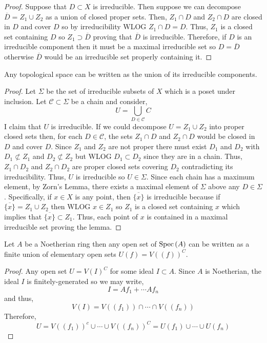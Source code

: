 \documentclass[12pt]{extarticle}
\begin{document}
\begin{proof}
Suppose that $D \subset X$ is irreducible. Then suppose we can decompose $\overline{D} = Z_1 \cup Z_2$ as a union of closed proper sets. Then, $Z_1 \cap D$ and $Z_2 \cap D$ are closed in $D$ and cover $D$ so by irreducibility WLOG $Z_1 \cap D = D$. Thus, $Z_1$ is a closed set containing $D$ so $Z_1 \supset \overline{D}$ proving that $\overline{D}$ is irreducible. Therefore, if $D$ is an irreducible component then it must be a maximal irreducible set so $D = \overline{D}$ otherwise $\overline{D}$ would be an irreducible set properly containing it. 
\end{proof}

\begin{lemma}
Any topological space can be written as the union of its irreducible components.
\end{lemma}

\begin{proof}
Let $\Sigma$ be the set of irreducible subsets of $X$ which is a poset under inclusion. Let $\mathcal{C} \subset \Sigma$ be a chain and consider,
\[ U = \bigcup_{D \in \mathcal{C}} C \]
I claim that $U$ is irreducible. If we could decompose $U = Z_1 \cup Z_2$ into proper closed sets then, for each $D \in \mathcal{C}$, the sets $Z_1 \cap D$ and $Z_2 \cap D$ would be closed in $D$ and cover $D$. Since $Z_1$ and $Z_2$ are not proper there must exist $D_1$ and $D_2$ with $D_1 \not\subset Z_1$ and $D_2 \not\subset Z_2$ but WLOG $D_1 \subset D_2$ since they are in a chain. Thus, $Z_1 \cap D_2$ and $Z_2 \cap D_2$ are proper closed sets covering $D_2$ contradicting its irreducibility. Thus, $U$ is irreducible so $U \in \Sigma$. Since each chain has a maximum element, by Zorn's Lemma, there exists a maximal element of $\Sigma$ above any $D \in \Sigma$. Specifically, if $x \in X$ is any point, then $\overline{\{x\}}$ is irreducible because if $\overline{\{x\}} = Z_1 \cup Z_2$ then WLOG $x \in Z_1$ so $Z_1$ is a closed set containing $x$ which implies that $\overline{\{x\}} \subset Z_1$. Thus, each point of $x$ is contained in a maximal irreducible set proving the lemma. 
\end{proof}

\begin{lemma} \label{finite_union_elementary_open}
Let $A$ be a Noetherian ring then any open set of $\mathrm{Spec}\left( A \right)$ can be written as a finite union of elementary open sets $U(f) = V((f))^C$. 
\end{lemma}

\begin{proof}
Any open set $U = V(I)^C$ for some ideal $I \subset A$. Since $A$ is Noetherian, the ideal $I$ is finitely-generated so we may write,
\[ I = Af_1 + \cdots A f_n \]
and thus,
\[ V(I) = V((f_1)) \cap \cdots \cap V((f_n)) \]
Therefore,
\[ U = V((f_1))^c \cup \cdots \cup V((f_n))^C = U(f_1) \cup \cdots \cup U(f_n) \]
\end{proof}
\end{document}
